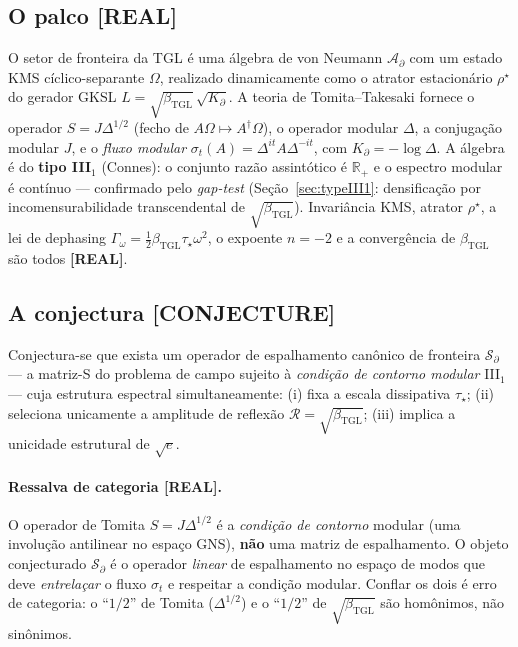 \documentclass[12pt,a4paper]{article}
\newcommand{\betatgl}{\beta_{\text{TGL}}}
\newcommand{\Kpartial}{K_{\partial}}
\newcommand{\rhostar}{\rho^{\star}}
\newcommand{\TGL}{\textsc{TGL}}
\begin{document}
\subsection{O palco \textbf{[REAL]}}
O setor de fronteira da \TGL{} é uma álgebra de von Neumann $\mathcal A_\partial$ com um estado KMS cíclico-separante $\Omega$, realizado dinamicamente como o atrator estacionário $\rhostar$ do gerador GKSL $L=\sqrt{\betatgl}\,\sqrt{\Kpartial}$. A teoria de Tomita--Takesaki fornece o operador $S=J\Delta^{1/2}$ (fecho de $A\Omega\mapsto A^\dagger\Omega$), o operador modular $\Delta$, a conjugação modular $J$, e o \emph{fluxo modular} $\sigma_t(A)=\Delta^{it}A\Delta^{-it}$, com $\Kpartial=-\log\Delta$.  A álgebra é do \textbf{tipo III$_1$} (Connes): o conjunto razão assintótico é $\mathbb{R}_+$ e o espectro modular é contínuo --- confirmado pelo \emph{gap-test} (Seção~\ref{sec:typeIII1}: densificação por incomensurabilidade transcendental de $\sqrt{\betatgl}$).  Invariância KMS, atrator $\rhostar$, a lei de dephasing $\Gamma_\omega=\tfrac12\betatgl\tau_\star\omega^2$, o expoente $n=-2$ e a convergência de $\betatgl$ são todos \textbf{[REAL]}.

\subsection{A conjectura \textbf{[CONJECTURE]}}
Conjectura-se que exista um operador de espalhamento canônico de fronteira $\mathcal S_\partial$ --- a matriz-S do problema de campo sujeito à \emph{condição de contorno modular} III$_1$ --- cuja estrutura espectral simultaneamente: (i) fixa a escala dissipativa $\tau_\star$; (ii) seleciona unicamente a amplitude de reflexão $\mathcal R=\sqrt{\betatgl}$; (iii) implica a unicidade estrutural de $\sqrt e$.

\paragraph{Ressalva de categoria \textbf{[REAL]}.} O operador de Tomita $S=J\Delta^{1/2}$ é a \emph{condição de contorno} modular (uma involução antilinear no espaço GNS), \textbf{não} uma matriz de espalhamento.  O objeto conjecturado $\mathcal S_\partial$ é o operador \emph{linear} de espalhamento no espaço de modos que deve \emph{entrelaçar} o fluxo $\sigma_t$ e respeitar a condição modular.  Conflar os dois é erro de categoria: o ``$1/2$'' de Tomita ($\Delta^{1/2}$) e o ``$1/2$'' de $\sqrt{\betatgl}$ são homônimos, não sinônimos.
\end{document}
